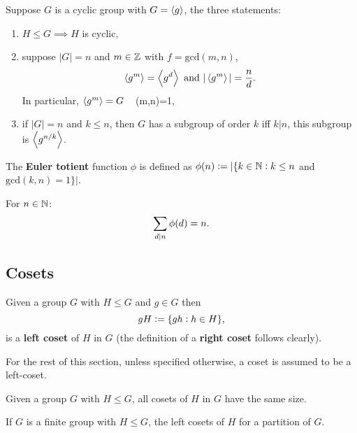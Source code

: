 \documentclass[../Year1/Year1.tex]{subfiles}
\begin{document}
\begin{theorem}
    Suppose  $G$ is a cyclic group with $G = \left\langle g \right\rangle$, the three statements: \begin{enumerate}
        \item $H\leq G \implies H$ is cyclic,
        \item suppose $|G| = n$ and $m\in\mathbb{Z}$ with $f=\text{gcd}(m,n)$, \[
            \abr{g^m} = \abr{g^d} \ \text{\textcolor{black}{ and }} |\abr{g^m}| = \frac{n}{d}
            \textcolor{black}{.}
        \] In particular, $\left\langle g^m \right\rangle = G$  \ \text{\textcolor{black}{ iff }} (m,n)=1,
        \item if $|G|=n$ and $k\leq n$, then $G$ has a subgroup of order $k$ iff $k|n$, this subgroup is $\left\langle g^{n/k} \right\rangle$.
    \end{enumerate}
\end{theorem}

\begin{definition}
    The \textbf{Euler totient} function $\phi$ is defined as $\phi(n):=|\{k\in\mathbb{N}: k\leq n$ and $\text{gcd}(k,n)=1\}|$.
\end{definition}

\begingroup\belowdisplayskip=-10pt
\begin{corollary}
    For $n\in\mathbb{N}$: \[
        \sum_{d|n}\phi(d) = n
        \textcolor{black}{.}
    \]
\end{corollary}
\endgroup

\subsection{Cosets}

\begin{definition}[Coset]
    Given a group $G$ with $H\leq G$ and $g\in G$ then \[
    gH := \{gh: h\in H\}
    \textcolor{black}{,}
    \]
    is a \textbf{left coset} of $H$ in $G$ (the definition of a \textbf{right coset} follows clearly).
\end{definition}

\begin{note}
    For the rest of this section, unless specified otherwise, a coset is assumed to be a left-coset.
\end{note}

\begin{theorem}
    Given a group $G$ with $H\leq G$, all cosets of $H$ in $G$ have the same size.
\end{theorem}

\begin{theorem}
    If $G$ is a finite group with $H\leq G$, the left cosets of $H$ for a partition of $G$.
\end{theorem}
\end{document}
